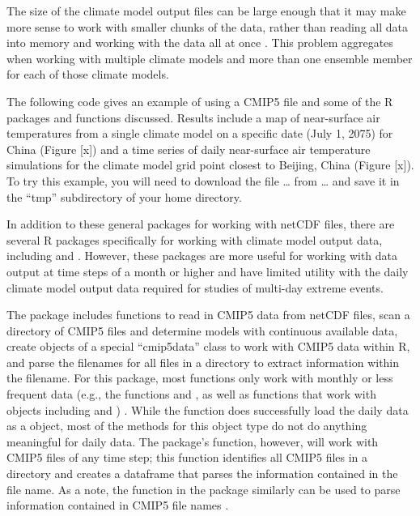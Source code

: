 The size of the climate model output files can be large enough that it
may make more sense to work with smaller chunks of the data, rather than
reading all data into memory and working with the data all at once
\citep{RCMIP5}. This problem aggregates when working with multiple
climate models and more than one ensemble member for each of those
climate models.

The following code gives an example of using a CMIP5 file and some of
the R packages and functions discussed. Results include a map of
near-surface air temperatures from a single climate model on a specific
date (July 1, 2075) for China (Figure {[}x{]}) and a time series of
daily near-surface air temperature simulations for the climate model
grid point closest to Beijing, China (Figure {[}x{]}). To try this
example, you will need to download the file \ldots{} from \ldots{} and
save it in the ``tmp'' subdirectory of your home directory.

In addition to these general packages for working with netCDF files,
there are several R packages specifically for working with climate model
output data, including  \citep{RCMIP5} and 
\citep{wux}. However, these packages are more useful for working with
data output at time steps of a month or higher and have limited utility
with the daily climate model output data required for studies of
multi-day extreme events.

The  package includes functions to read in CMIP5 data from
netCDF files, scan a directory of CMIP5 files and determine models with
continuous available data, create objects of a special ``cmip5data''
class to work with CMIP5 data within R, and parse the filenames for all
files in a directory to extract information within the filename. For
this package, most functions only work with monthly or less frequent
data (e.g., the functions  and ,
as well as functions that work with  objects including
 and ) \citep{RCMIP5}.
While the  function does successfully load the daily
data as a  object, most of the methods for this object
type do not do anything meaningful for daily data. The package's
 function, however, will work with CMIP5 files of any
time step; this function identifies all CMIP5 files in a directory and
creates a dataframe that parses the information contained in the file
name. As a note, the  function in the
 package similarly can be used to parse information
contained in CMIP5 file names \citep{ncdf4.helpers}.

